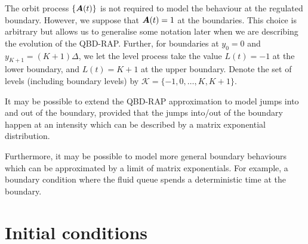 The orbit process \(\{\boldsymbol A(t)\}\) is not required to model the behaviour at the regulated boundary. However, we suppose that \(\boldsymbol A(t)=1\) at the boundaries. This choice is arbitrary but allows us to generalise some notation later when we are describing the evolution of the QBD-RAP. Further, for boundaries at \(y_0=0\) and \(y_{K+1} = (K+1)\Delta\), we let the level process take the value \(L(t)=-1\) at the lower boundary, and \(L(t)=K+1\) at the upper boundary. Denote the set of levels (including boundary levels) by \(\mathcal K = \{-1,0,\dots,K,K+1\}\). 

\begin{rem}
	It may be possible to extend the QBD-RAP approximation to model jumps into and out of the boundary, provided that the jumps into/out of the boundary happen at an intensity which can be described by a matrix exponential distribution. 
	
	Furthermore, it may be possible to model more general boundary behaviours which can be approximated by a limit of matrix exponentials. For example, a boundary condition where the fluid queue spends a deterministic time at the boundary. 
\end{rem}

\section{Initial conditions}\label{sec: initial conditions}

